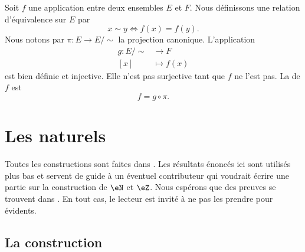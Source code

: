\begin{example}
Soit \( f\) une application entre deux ensembles \( E\) et \( F\). Nous définissons une relation d'équivalence sur \( E\) par
\begin{equation}
    x\sim y\Leftrightarrow f(x)=f(y).
\end{equation}
Nous notons par \( \pi\colon E\to E/\sim\) la projection canonique. L'application
\begin{equation}
    \begin{aligned}
        g\colon E/\sim&\to F \\
        [x]&\mapsto f(x)
    \end{aligned}
\end{equation}
est bien définie et injective. Elle n'est pas surjective tant que \( f\) ne l'est pas. La  de \( f\) est
\begin{equation}
    f=g\circ\pi.
\end{equation}
\end{example}

\section{Les naturels}
\label{SECooPJSYooNYaIaq}

Toutes les constructions sont faites dans \cite{RWWJooJdjxEK}. Les résultats énoncés ici sont utilisés plus bas et servent de guide à un éventuel contributeur qui voudrait écrire une partie sur la construction de \( \eN\) et \( \eZ\). Nous espérons que des preuves se trouvent dans \cite{RWWJooJdjxEK}. En tout cas, le lecteur est invité à ne pas les prendre pour évidents.

\subsection{La construction}

